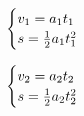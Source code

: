 \begin{equation} \begin{cases}v_{1}=a_1 t_{1}\\ s=\frac{1}{2}a_{1} t_{1}^{2}\\ \end{cases}\ \\  \end{equation}

\begin{equation} \begin{cases}v_{2}=a_2 t_{2}\\ s=\frac{1}{2}a_{2} t_{2}^{2}\\ \end{cases}\ \\  \end{equation}
